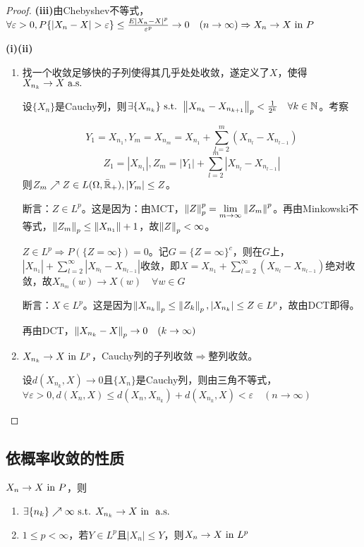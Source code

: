 \documentclass{ctexbook}
\begin{document}
  \begin{proof}
    \textbf{(iii)}由Chebyshev不等式，$\forall \varepsilon>0, P\{|X_{n}-X|>\varepsilon\}\leq \frac{E|X_{n}-X|^{p}}{\varepsilon^{p}}\to 0\quad (n\to\infty)\Rightarrow X_{n}\to X\cvin P$

    \textbf{(i)(ii)}
    \begin{enumerate}
    \item 找一个收敛足够快的子列使得其几乎处处收敛，遂定义了$X$，使得$X_{n_{k}}\to X\text{ a.s. }$

      设$\{X_{n}\}$是Cauchy列，则$\exists\{X_{n_{k}}\}\text{ s.t. } \left\|X_{n_{k}}-X_{n_{{k+1}}}\right\|_{p}<\frac{1}{2^{k}}\quad \forall k\in\mathbb{N}$。考察

      \[Y_{1}=X_{n_{1}},Y_{m}=X_{n_{m}}=X_{n_{1}}+\sum_{l=2}^{m}(X_{n_{l}}-X_{n_{l-1}})\]
      \[Z_{1}=|X_{n_{1}}|,Z_{m}=|Y_{1}|+\sum_{l=2}^{m}|X_{n_{l}}-X_{n_{l-1}}|\]
      则$Z_{m}\nearrow Z\in L(\Omega,\bar{\mathbb{R}}_{+}), |Y_{m}|\leq Z$。

      断言：$Z\in L^{p}$。这是因为：由MCT，$\left\|Z\right\|_{p}^{p}=\lim\limits_{m\to\infty}\left\|Z_{m}\right\|^{p}$。再由Minkowski不等式，$\left\|Z_{m}\right\|_{p}\leq \left\|X_{n_{1}}\right\|+1$，故$\left\|Z\right\|_{p}<\infty$。

      $Z\in L^{p}\Rightarrow P(\{Z=\infty\})=0$。记$G=\{Z=\infty\}^{c}$，则在$G$上，$|X_{n_{1}}|+\sum_{l=2}^{\infty}|X_{n_{l}}-X_{n_{l-1}}|$收敛，即$X=X_{n_{1}}+\sum_{l=2}^{\infty}(X_{n_{l}}-X_{n_{l-1}})$绝对收敛，故$X_{n_{m}}(w)\to X(w)\quad\forall w\in G$

      断言：$X\in L^{p}$。这是因为$\left\|X_{n_{k}}\right\|_{p}\leq\left\|Z_{k}\right\|_{p}, |X_{n_{k}}|\leq Z\in L^{p}$，故由DCT即得。

      再由DCT，$\left\|X_{n_{k}}-X\right\|_{p}\to 0\quad (k\to\infty)$
    \item $X_{n_{k}}\to X\text{ in } L^{p}$，Cauchy列的子列收敛$\Rightarrow $整列收敛。

      设$d(X_{n_{k}},X)\to 0$且$\{X_{n}\}$是Cauchy列，则由三角不等式，$\forall\varepsilon>0, d(X_{n},X)\leq d(X_{n},X_{n_{k}})+d(X_{n_{k}},X)<\varepsilon\quad (n\to\infty)$
    \end{enumerate}
  \end{proof}

\subsection{依概率收敛的性质}
\begin{Prop}
  $X_{n}\to X\text{ in } P$，则
  \begin{enumerate}
  \item $\exists \{n_{k}\}\nearrow \infty\text{ s.t. } X_{n_{k}}\to X\text{ in }\text{ a.s. }$
  \item $1\leq p<\infty$，若$Y\in L^{p}$且$|X_{n}|\leq Y$，则$X_{n}\to X\text{ in } L^{p}$
  \end{enumerate}
\end{Prop}
\end{document}
